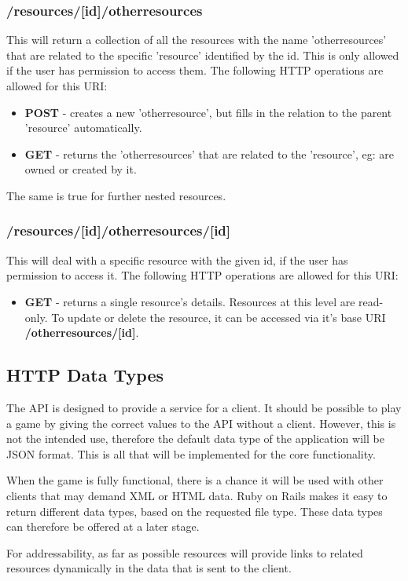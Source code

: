 \subsubsection{/resources/[id]/otherresources}
This will return a collection of all the resources with the name 'otherresources' that are related to the specific 'resource' identified by the id. This is only allowed if the user has permission to access them. The following HTTP operations are allowed for this URI:
\begin{itemize}
	\item \textbf{POST} - creates a new 'otherresource', but fills in the relation to the parent 'resource' automatically.
	\item \textbf{GET} - returns the 'otherresources' that are related to the 'resource', eg: are owned or created by it.
\end{itemize}
The same is true for further nested resources.
\subsubsection{/resources/[id]/otherresources/[id]}
This will deal with a specific resource with the given id, if the user has permission to access it. The following HTTP operations are allowed for this URI:
\begin{itemize}
	\item \textbf{GET} - returns a single resource's details. Resources at this level are read-only. To update or delete the resource, it can be accessed via it's base URI \textbf{/otherresources/[id]}.
\end{itemize}

\subsection{HTTP Data Types}
The API is designed to provide a service for a client. It should be possible to play a game by giving the correct values to the API without a client. However, this is not the intended use, therefore the default data type of the application will be JSON format. This is all that will be implemented for the core functionality.

When the game is fully functional, there is a chance it will be used with other clients that may demand XML or HTML data. Ruby on Rails makes it easy to return different data types, based on the requested file type. These data types can therefore be offered at a later stage.

For addressability, as far as possible resources will provide links to related resources dynamically in the data that is sent to the client.

